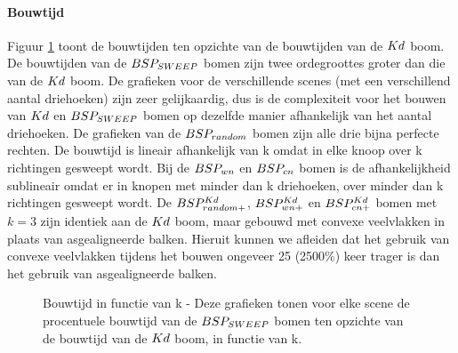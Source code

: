 \paragraph{Bouwtijd} Figuur \ref{fig:k-bouwtijd} toont de bouwtijden ten opzichte van de bouwtijden van de $Kd$ boom. De bouwtijden van de $BSP_{SWEEP}$ bomen zijn twee ordegroottes groter dan die van de $Kd$ boom. De grafieken voor de verschillende scenes (met een verschillend aantal driehoeken) zijn zeer gelijkaardig, dus is de complexiteit voor het bouwen van $Kd$ en $BSP_{SWEEP}$ bomen op dezelfde manier afhankelijk van het aantal driehoeken. De grafieken van de $BSP_{random}$ bomen zijn alle drie bijna perfecte rechten. De bouwtijd is lineair afhankelijk van k omdat in elke knoop over k richtingen gesweept wordt. Bij de $BSP_{wn}$ en $BSP_{cn}$ bomen is de afhankelijkheid sublineair omdat er in knopen met minder dan k driehoeken, over minder dan k richtingen gesweept wordt. 
De $BSP^{Kd}_{random+}$, $BSP^{Kd}_{wn+}$ en $BSP^{Kd}_{cn+}$ bomen met $k = 3$ zijn identiek aan de $Kd$ boom, maar gebouwd met convexe veelvlakken in plaats van asgealigneerde balken.
Hieruit kunnen we afleiden dat het gebruik van convexe veelvlakken tijdens het bouwen ongeveer 25 (2500\%) keer trager is dan het gebruik van asgealigneerde balken.
\begin{figure}[h]
  \centering
  \begin{subfigure}[t]{.32\linewidth}
    \centering
{}
  \end{subfigure}
  \begin{subfigure}[t]{.32\linewidth}
    \centering
{}
\end{subfigure}
\begin{subfigure}[t]{.32\linewidth}
  \centering
{}
\end{subfigure}
\caption[Bouwtijd in functie van k]{Bouwtijd in functie van k - \small Deze grafieken tonen voor elke scene de procentuele bouwtijd van de $BSP_{SWEEP}$ bomen ten opzichte van de bouwtijd van de $Kd$ boom, in functie van k.}
\label{fig:k-bouwtijd}
\end{figure}


